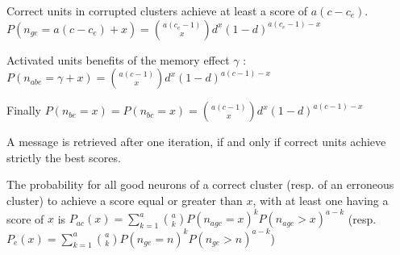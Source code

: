 \documentclass[english,11pt,twocolumn]{article}
\theoremstyle{definition}
\begin{document}
	Correct units in corrupted clusters achieve at least a score of $a(c - c_e)$. 
	$P(n_{ge} = a(c - c_e) + x) = {a (c_e - 1) \choose x} d^x (1-d)^{a (c_e - 1)-x}$
	
	
	Activated units benefits of the memory effect $\gamma$ :	\\
	$P(n_{abe} = \gamma + x) = {a(c - 1) \choose x} d^x (1-d)^{a(c-1)-x}$
	
	
	Finally $P(n_{be} = x) = P(n_{bc} = x) = {a(c - 1) \choose x} d^x (1-d)^{a(c- 1) -x}$	
	
	A message is retrieved after one iteration, if and only if correct units achieve strictly the best scores.	
	
	

	
	
	
	
	The probability for all good neurons of a correct cluster (resp. of an erroneous cluster) to achieve a score equal or greater than $x$, with at least one having a score of $x$ is $P_{ac} (x) = \sum_{k = 1}^{a} { a \choose k }   P(n_{agc} = x)^k P(n_{agc} > x)^{a-k}$ (resp. $P_e(x) = \sum_{k = 1}^a { a \choose k } P(n_{ge} = n)^k P(n_{ge} > n)^{a-k}$)

	
	
\end{document}
